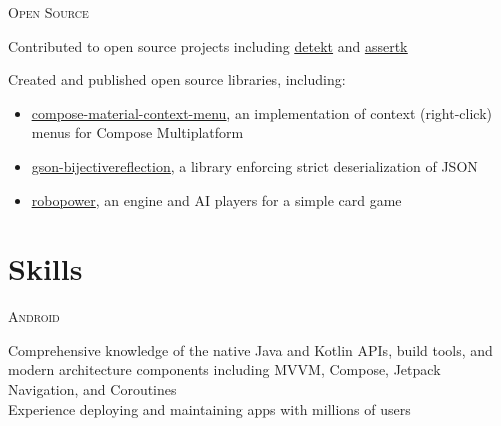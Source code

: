 \documentclass[letterpaper,10pt]{article}
\newenvironment{lcol}
{
    \begin{minipage}[t]{.18\linewidth}
    \begin{flushright}
}
{
    \end{flushright}
    \end{minipage}
}
\newenvironment{rcol}
{
    \hspace{.005\linewidth}
    \begin{minipage}[t]{.8\linewidth}
}
{
    \end{minipage}
}
\begin{document}
\vspace{6pt}

\begin{lcol}
    \textsc{Open Source}
\end{lcol}
\begin{rcol}
    Contributed to open source projects including \href{https://github.com/detekt/detekt/issues?q=author\%3Adzirbel}{\underline{ detekt}} and \href{https://github.com/willowtreeapps/assertk/issues?q=author\%3Adzirbel}{\underline{ assertk}}
    
    \vspace{6pt}

    Created and published open source libraries, including:
    
    \begin{itemize}[itemsep=2pt]
      \item \href{https://github.com/dzirbel/compose-material-context-menu}{ \underline{compose-material-context-menu}}, an implementation of context (right-click) menus for Compose Multiplatform
      \item \href{https://github.com/dzirbel/gson-bijectivereflection}{ \underline{gson-bijectivereflection}}, a library enforcing strict deserialization of JSON
      \item \href{https://github.com/dzirbel/robopower}{ \underline{robopower}}, an engine and AI players for a simple card game
    \end{itemize}
\end{rcol}

\section{Skills}

\begin{lcol}
    \textsc{Android }
\end{lcol}
\begin{rcol}
    Comprehensive knowledge of the native Java and Kotlin APIs, build tools, and modern architecture components including MVVM, Compose, Jetpack Navigation, and Coroutines
    \vspace{2pt} \\
    Experience deploying and maintaining apps with millions of users
\end{rcol}

\vspace{6pt}
\end{document}

